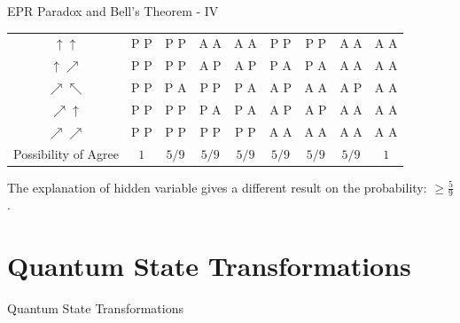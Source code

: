 \documentclass{beamer}
\begin{document}
\begin{frame}{EPR Paradox and Bell's Theorem - IV}
{\begin{table}[h!]
\begin{center}
\begin{tabular}{c|c|c|c|c|c|c|c|c}
      $\uparrow \uparrow$ & P          P                  & P          P                  & A          A                  & A          A                  & P          P                  & P          P                  & A          A                  & A          A                  \\
      $\uparrow \nearrow$ & P          P                  & P          P                  & A          P                  & A          P                  & P          A                  & P          A                  & A          A                  & A          A                  \\
      $\nearrow \nwarrow$ & P          P                  & P          A                  & P          P                  & P          A                  & A          P                  & A          A                  & A          P                  & A          A                  \\
      $\nearrow \uparrow$ & P          P                  & P          P                  & P          A                  & P          A                  & A          P                  & A          P                  & A          A                  & A          A                  \\
      $\nearrow \nearrow$ & P          P                  & P          P                  & P          P                  & P          P                  & A          A                  & A          A                  & A          A                  & A          A                  \\
      \hline
     Possibility of Agree & $1$                           & $5/9$                         & $5/9$                         & $5/9$                         & $5/9$                         & $5/9$                         & $5/9$                         & $1$                           \\
    \end{tabular}
  \end{center}
  \end{table}
  The explanation of hidden variable gives a different result on the probability: $\ge  \frac{5}{9}$.
  }%
\end{frame}

\section{Quantum State Transformations}
\begin{frame}
  Quantum State Transformations
\end{frame}
\end{document}
